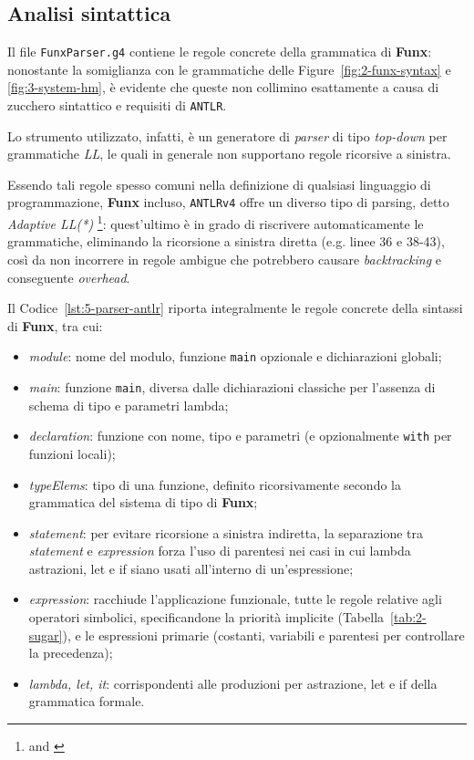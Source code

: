 \subsection{Analisi sintattica}
\label{sec:5-3-syntactic-analysis}

Il file \texttt{FunxParser.g4} contiene le regole concrete della grammatica di \textbf{Funx}:
nonostante la somiglianza con le grammatiche delle Figure~\ref{fig:2-funx-syntax} e \ref{fig:3-system-hm},
è evidente che queste non collimino esattamente a causa di zucchero sintattico e requisiti di \texttt{ANTLR}.

\noindent Lo strumento utilizzato, infatti, è un generatore di \textit{parser} di tipo \textit{top-down}
per grammatiche \textit{LL}, le quali in generale non supportano regole ricorsive a sinistra.

\noindent Essendo tali regole spesso comuni nella definizione di qualsiasi linguaggio di programmazione,
\textbf{Funx} incluso, \texttt{ANTLRv4} offre un diverso tipo di parsing, detto \textit{Adaptive LL(*)}%
\footnote{ \cite{Parr-2011-FoundationANTLR}
    and  \cite{Parr-2014-AdaptiveLL}}:
quest'ultimo è in grado di riscrivere automaticamente le grammatiche, eliminando la ricorsione a sinistra diretta (e.g. linee 36 e 38-43),
così da non incorrere in regole ambigue che potrebbero causare \textit{backtracking} e conseguente \textit{overhead}.

\noindent Il Codice~\ref{lst:5-parser-antlr} riporta integralmente le regole concrete della sintassi di \textbf{Funx}, tra cui:
\begin{itemize}
    \item \textit{module}: nome del modulo, funzione \texttt{main} opzionale e dichiarazioni globali;
    \item \textit{main}: funzione \texttt{main}, diversa dalle dichiarazioni classiche per l'assenza di schema di tipo e parametri lambda;
    \item \textit{declaration}: funzione con nome, tipo e parametri (e opzionalmente \texttt{with} per funzioni locali);
    \item \textit{typeElems}: tipo di una funzione, definito ricorsivamente secondo la grammatica del sistema di tipo di \textbf{Funx};
    \item \textit{statement}: per evitare ricorsione a sinistra indiretta, la separazione tra \textit{statement} e \textit{expression}
          forza l'uso di parentesi nei casi in cui lambda astrazioni, let e if siano usati all'interno di un'espressione;
    \item \textit{expression}: racchiude l'applicazione funzionale, tutte le regole relative agli operatori simbolici,
          specificandone la priorità implicite (Tabella~\ref{tab:2-sugar}), e le espressioni primarie
          (costanti, variabili e parentesi per controllare la precedenza);
    \item \textit{lambda, let, it}: corrispondenti alle produzioni per astrazione, let e if della grammatica formale.
\end{itemize}

